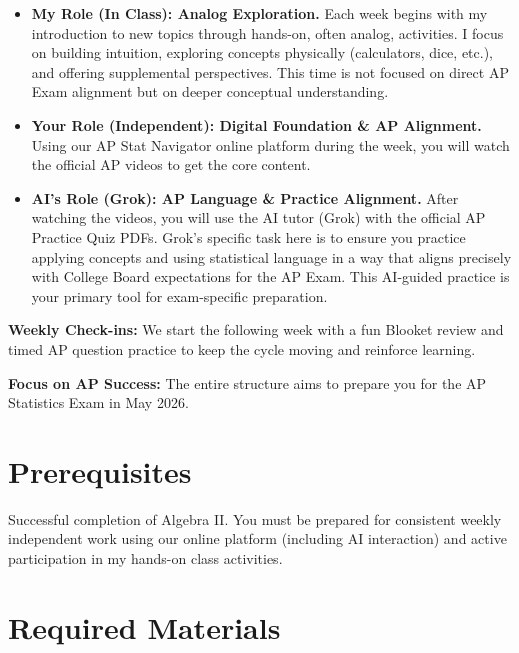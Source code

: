 \documentclass[11pt]{article}
\begin{document}
\begin{itemize}[leftmargin=*]
  \item \textbf{My Role (In Class): Analog Exploration.} Each week begins with my introduction to new topics through hands-on, often analog, activities. I focus on building intuition, exploring concepts physically (calculators, dice, etc.), and offering supplemental perspectives. This time is not focused on direct AP Exam alignment but on deeper conceptual understanding.

  \item \textbf{Your Role (Independent): Digital Foundation \& AP Alignment.} Using our AP Stat Navigator online platform during the week, you will watch the official AP videos to get the core content.

  \item \textbf{AI's Role (Grok): AP Language \& Practice Alignment.} After watching the videos, you will use the AI tutor (Grok) with the official AP Practice Quiz PDFs. Grok's specific task here is to ensure you practice applying concepts and using statistical language in a way that aligns precisely with College Board expectations for the AP Exam. This AI-guided practice is your primary tool for exam-specific preparation.
\end{itemize}

\textbf{Weekly Check-ins:} We start the following week with a fun Blooket review and timed AP question practice to keep the cycle moving and reinforce learning.

\textbf{Focus on AP Success:} The entire structure aims to prepare you for the AP Statistics Exam in May 2026.

\section{Prerequisites}

Successful completion of Algebra II. You must be prepared for consistent weekly independent work using our online platform (including AI interaction) and active participation in my hands-on class activities.

\section{Required Materials}
\end{document}
